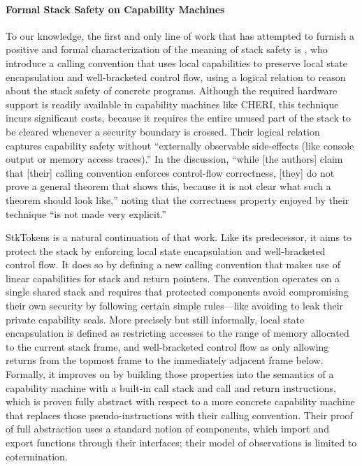 \documentclass[acmsmall,review,anonymous]{acmart}\settopmatter{printfolios=true,printccs=false,printacmref=false}
\begin{document}
{{%

\paragraph{Formal Stack Safety on Capability Machines}
%
To our knowledge, the first and only line of work that has attempted
to furnish a positive and formal characterization of the meaning of
stack safety is \citet{Skorstengaard+19b}, who introduce a calling
convention that uses local capabilities to preserve local state
encapsulation and well-bracketed control flow, using a logical
relation to reason about the stack safety of concrete
programs. Although the required hardware support is readily available
in capability machines like CHERI, this technique incurs significant
costs, because it requires the entire unused part of the stack to be
cleared whenever a security boundary is crossed. Their logical
relation captures capability safety without ``externally observable
side-effects (like console output or memory access traces).'' In the
discussion, ``while [the authors] claim that [their] calling
convention enforces control-flow correctness, [they] do not prove a
general theorem that shows this, because it is not clear what such a
theorem should look like,'' noting that the correctness property
enjoyed by their technique ``is not made very explicit.''

StkTokens \citep{Skorstengaard+19} is a natural continuation of that work. Like
its predecessor, it aims to protect the stack by enforcing local state
encapsulation and well-bracketed control flow. It does so by defining a new
calling convention that makes use of linear capabilities for stack and return
pointers. The convention operates on a single shared stack and requires that
protected components avoid compromising their own security by following certain
simple rules---like avoiding to leak their private capability seals. More
precisely but still informally, local state encapsulation is defined as
restricting accesses to the range of memory allocated to the current stack
frame, and well-bracketed control flow as only allowing returns from the topmost
frame to the immediately adjacent frame below. Formally, it improves on
\citet{Skorstengaard+19b} by building those properties into the semantics of a
capability machine with a built-in call stack and call and return instructions,
which is proven fully abstract with respect to a more concrete capability
machine that replaces those pseudo-instructions with their calling convention.
Their proof of full abstraction uses a standard notion of components, which
import and export functions through their interfaces; their model of
observations is limited to cotermination.

}}
\end{document}
